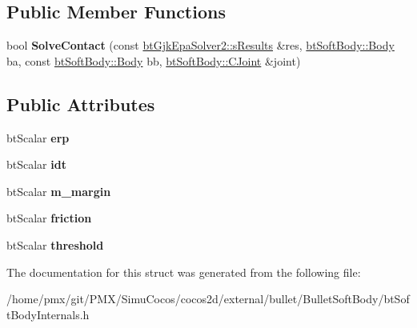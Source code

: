 \subsection*{Public Member Functions}
\begin{DoxyCompactItemize}
\item 
\mbox{\label{structbtSoftColliders_1_1ClusterBase_ab26446fdc6789ceb6cd62026286ffe48}} 
bool {\bfseries Solve\+Contact} (const \hyperlink{structbtGjkEpaSolver2_1_1sResults}{bt\+Gjk\+Epa\+Solver2\+::s\+Results} \&res, \hyperlink{structbtSoftBody_1_1Body}{bt\+Soft\+Body\+::\+Body} ba, const \hyperlink{structbtSoftBody_1_1Body}{bt\+Soft\+Body\+::\+Body} bb, \hyperlink{structbtSoftBody_1_1CJoint}{bt\+Soft\+Body\+::\+C\+Joint} \&joint)
\end{DoxyCompactItemize}
\subsection*{Public Attributes}
\begin{DoxyCompactItemize}
\item 
\mbox{\label{structbtSoftColliders_1_1ClusterBase_a82d6cd269c34a357f57fad47d25a7944}} 
bt\+Scalar {\bfseries erp}
\item 
\mbox{\label{structbtSoftColliders_1_1ClusterBase_aa4352eb15bb87065d0a563b7fa0e51c1}} 
bt\+Scalar {\bfseries idt}
\item 
\mbox{\label{structbtSoftColliders_1_1ClusterBase_a50d0c2e6bf7e3c8aeb52860bc92e5325}} 
bt\+Scalar {\bfseries m\+\_\+margin}
\item 
\mbox{\label{structbtSoftColliders_1_1ClusterBase_ae24b72c7cf2ccb09be9b158f95a4a97b}} 
bt\+Scalar {\bfseries friction}
\item 
\mbox{\label{structbtSoftColliders_1_1ClusterBase_aa3eae39623570545e366bc8571e82ef0}} 
bt\+Scalar {\bfseries threshold}
\end{DoxyCompactItemize}


The documentation for this struct was generated from the following file\+:\begin{DoxyCompactItemize}
\item 
/home/pmx/git/\+P\+M\+X/\+Simu\+Cocos/cocos2d/external/bullet/\+Bullet\+Soft\+Body/bt\+Soft\+Body\+Internals.\+h\end{DoxyCompactItemize}
